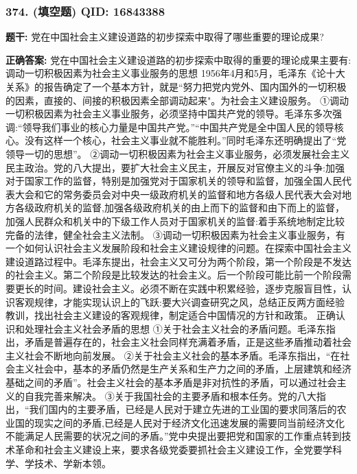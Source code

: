 \documentclass[12pt,UTF8]{ctexart}
\begin{document}
\vspace{0.3em}\hrulefill\vspace{0.7em}

\subsubsection*{374. (填空题) \small QID: 16843388}

\textbf{题干:}
党在中国社会主义建设道路的初步探索中取得了哪些重要的理论成果?

\textbf{正确答案:}
党在中国社会主义建设道路的初步探索中取得的重要的理论成果主要有:
调动一切积极因素为社会主义事业服务的思想
1956年4月和5月，毛泽东《论十大关系》的报告确定了一个基本方针，就是“努力把党内党外、国内国外的一切积极的因素，直接的、间接的积极因素全部调动起来"。为社会主义建设服务。
①调动一切积极因素为社会主义事业服务，必须坚持中国共产党的领导。毛泽东多次强调:“领导我们事业的核心力量是中国共产党。”“中国共产党是全中国人民的领导核心。没有这样一个核心，社会主义事业就不能胜利。”同时毛泽东还明确提出了“党领导一切的思想”。
②调动一切积极因素为社会主义事业服务，必须发展社会主义民主政治。党的八大提出，要扩大社会主义民主，开展反对官僚主义的斗争:加强对于国家工作的监督，特别是加强党对于国家机关的领导和监督，加强全国人民代表大会和它的常务委员会对中央一级政府机关的监督和地方各级人民代表大会对地方各级政府机关的监督,加强各级政府机关的由上而下的监督和由下而上的监督，加强人民群众和机关中的下级工作人员对于国家机关的监督:着手系统地制定比较完备的法律，健全社会主义法制。
③调动一切积极因素为社会主义事业服务，有一个如何认识社会主义发展阶段和社会主义建设规律的问题。在探索中国社会主义建设道路过程中。毛泽东提出，社会主义又可分为两个阶段，第一个阶段是不发达的社会主义。第二个阶段是比较发达的社会主义。后一个阶段可能比前一个阶段需要更长的时间。建设社会主义。必须不断在实践中积累经验，逐步克服盲目性，认识客观规律，才能实现认识上的飞跃:要大兴调查研究之风，总结正反两方面经验教训，找出社会主义建设的客观规律，制定适合中国情况的方针和政策。
正确认识和处理社会主义社会矛盾的思想
①关于社会主义社会的矛盾问题。毛泽东指出，矛盾是普遍存在的，社会主义社会同样充满着矛盾，正是这些矛盾推动着社会主义社会不断地向前发展。
②关于社会主义社会的基本矛盾。毛泽东指出，“在社会主义社会中，基本的矛盾仍然是生产关系和生产力之间的矛盾，上层建筑和经济基础之间的矛盾”。社会主义社会的基本矛盾是非对抗性的矛盾，可以通过社会主义的自我完善来解决。
③关于我国社会的主要矛盾和根本任务。党的八大指出，“我们国内的主要矛盾，已经是人民对于建立先进的工业国的要求同落后的农业国的现实之间的矛盾,已经是人民对于经济文化迅速发展的需要同当前经济文化不能满足人民需要的状况之间的矛盾。”党中央提出要把党和国家的工作重点转到技术革命和社会主义建设上来，要求各级党委要抓社会主义建设工作，全党要学科学、学技术、学新本领。
\end{document}
